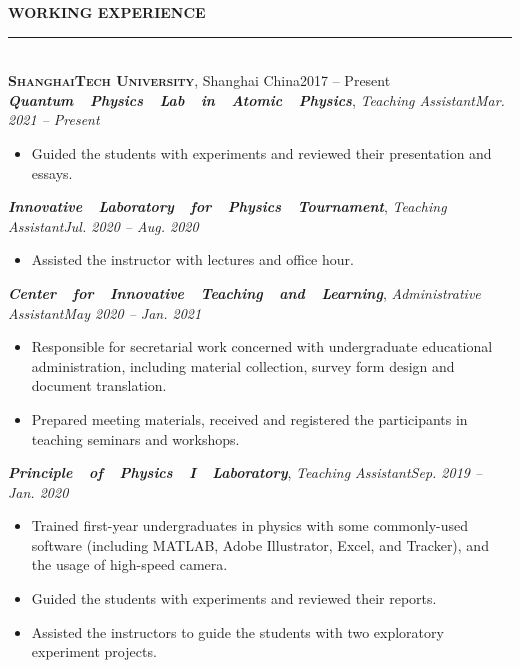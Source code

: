 \documentclass[letterpaper,11pt]{article}
\begin{document}
{\Large\bfseries{}WORKING EXPERIENCE}\\
\rule[1.5ex]{\columnwidth}{1pt}
\vspace{-4ex}\\
{\large\bfseries\scshape{}ShanghaiTech University}, Shanghai China\hfill{2017 -- Present}\\
{\bfseries\itshape{}Quantum~~Physics~~Lab~~in~~Atomic~~Physics}, {\itshape{}Teaching Assistant}\hfill{\itshape{}Mar. 2021 -- Present}\\
\vspace{-4ex}
\begin{itemize}
    \item Guided the students with experiments and reviewed their presentation and essays.
\end{itemize}
\vspace{-1ex}
{\bfseries\itshape{}Innovative~~Laboratory~~for~~Physics~~Tournament}, {\itshape{}Teaching Assistant}\hfill{\itshape{}Jul. 2020 -- Aug. 2020}\\
\vspace{-4ex}
\begin{itemize}
    \item Assisted the instructor with lectures and office hour.
\end{itemize}
\vspace{-1ex}
{\bfseries\itshape{}Center~~for~~Innovative~~Teaching~~and~~Learning}, {\itshape{}Administrative Assistant}\hfill{\itshape{}May 2020 -- Jan. 2021}\\
\vspace{-4ex}
\begin{itemize}
    \item Responsible for secretarial work concerned with undergraduate educational administration, including material collection, survey form design and document translation.
    \item Prepared meeting materials, received and registered the participants in teaching seminars and workshops.
\end{itemize}
\vspace{-1ex}
{\bfseries\itshape{}Principle~~of~~Physics~~I~~Laboratory}, {\itshape{}Teaching Assistant}\hfill{\itshape{}Sep. 2019 -- Jan. 2020}\\
\vspace{-4ex}
\begin{itemize}
    \item Trained first-year undergraduates in physics with some commonly-used software (including MATLAB, Adobe Illustrator, Excel, and Tracker), and the usage of high-speed camera.
    \item Guided the students with experiments and reviewed their reports.
    \item Assisted the instructors to guide the students with two exploratory experiment projects.
\end{itemize}
\end{document}
